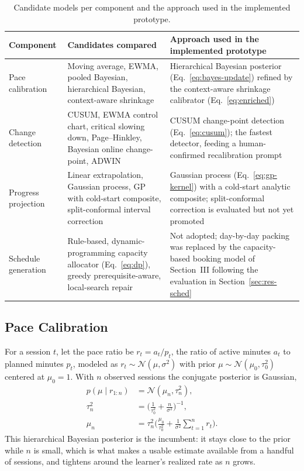 \documentclass[conference]{IEEEtran}
\begin{document}
\begin{table}[!t]
\centering
\caption{Candidate models per component and the approach used in the implemented prototype.}
\label{tab:candidates}
\begin{tabular}{p{2.6cm} p{7.6cm} p{6.4cm}}
\toprule
\textbf{Component} & \textbf{Candidates compared} & \textbf{Approach used in the implemented prototype} \\
\midrule
Pace calibration & Moving average, EWMA, pooled Bayesian, hierarchical Bayesian, context-aware shrinkage & Hierarchical Bayesian posterior (Eq.~\eqref{eq:bayes-update}) refined by the context-aware shrinkage calibrator (Eq.~\eqref{eq:enriched}) \\
Change detection & CUSUM, EWMA control chart, critical slowing down, Page--Hinkley, Bayesian online change-point, ADWIN & CUSUM change-point detection (Eq.~\eqref{eq:cusum}); the fastest detector, feeding a human-confirmed recalibration prompt \\
Progress projection & Linear extrapolation, Gaussian process, GP with cold-start composite, split-conformal interval correction & Gaussian process (Eq.~\eqref{eq:gp-kernel}) with a cold-start analytic composite; split-conformal correction is evaluated but not yet promoted \\
Schedule generation & Rule-based, dynamic-programming capacity allocator (Eq.~\eqref{eq:dp}), greedy prerequisite-aware, local-search repair & Not adopted; day-by-day packing was replaced by the capacity-based booking model of Section~III following the evaluation in Section~\ref{sec:res-sched} \\
\bottomrule
\end{tabular}
\end{table}

\subsection{Pace Calibration}
\label{sec:method-cal}
For a session $t$, let the pace ratio be $r_t = a_t/p_t$, the ratio of active minutes $a_t$ to planned minutes $p_t$, modeled as $r_t \sim \mathcal{N}(\mu,\sigma^2)$ with prior $\mu \sim \mathcal{N}(\mu_0,\tau_0^2)$ centered at $\mu_0=1$. With $n$ observed sessions the conjugate posterior is Gaussian,
\begin{equation}
\begin{split}
p(\mu \mid r_{1:n}) &= \mathcal{N}(\mu_n,\tau_n^2), \\
\tau_n^2 &= \Big(\tfrac{1}{\tau_0^2}+\tfrac{n}{\sigma^2}\Big)^{-1}, \\
\mu_n &= \tau_n^2\Big(\tfrac{\mu_0}{\tau_0^2}+\tfrac{1}{\sigma^2}\sum_{t=1}^{n} r_t\Big).
\end{split}
\label{eq:bayes-update}
\end{equation}
This hierarchical Bayesian posterior is the incumbent: it stays close to the prior while $n$ is small, which is what makes a usable estimate available from a handful of sessions, and tightens around the learner's realized rate as $n$ grows.
\end{document}
